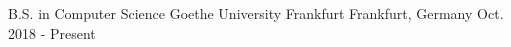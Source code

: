 

\begin{cventries}

  \cventry
    {B.S. in Computer Science} %
    {Goethe University Frankfurt} %
    {Frankfurt, Germany} %
    {Oct. 2018 - Present} %
    {
    }

\end{cventries}
